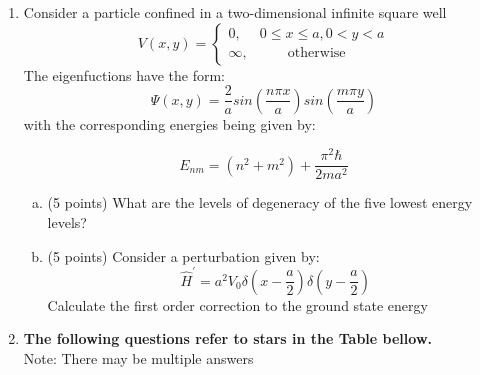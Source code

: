 \documentclass[12pt]{article}
\begin{document}
\def\pos{\medskip\quad}
\def\subpos{\smallskip \qquad}
\thispagestyle{empty}
\begin{enumerate}
\begin{center}
 \textbf{\large PHYS 20323/60323: FALL 2019 - LaTeX Example}
\end{center}
  \item Consider a particle confined in a two-dimensional infinite square well
  \begin{equation*}
    V(x,y) = 
    \begin{cases}
      0, &  0 \leq x \leq a,  0 < y < a \\ 
      \infty, & \qquad \text{otherwise}
    \end{cases}
  \end{equation*}
  The eigenfuctions have the form:
  \begin{equation*}
  \Psi(x,y) = \frac{2}{a}sin(\frac{n\pi x}{a})sin(\frac{m\pi y}{a})
  \end{equation*}
  with the corresponding energies being given by:
  
  \begin{equation*}
      E_{nm} = (n^{2} + m^{2}) + \frac{\pi^{2}\hbar}{2ma^{2}}
  \end{equation*}
  
  \begin{enumerate}[(a)]
      \item (5 points) What are the levels of degeneracy of the five lowest energy levels?
      \item (5 points) Consider a perturbation given by:
      \begin{equation*}
          \hat{H}^{'} = a^{2}V_{0}\delta(x-\frac{a}{2})\delta(y-\frac{a}{2})
      \end{equation*}
      Calculate the first order correction to the ground state energy
  \end{enumerate}
  \item \textbf{The following questions refer to stars in the Table bellow.} \\
  Note: There may be multiple answers
  \begin{center}
 

\end{center}
\end{enumerate}
\end{document}
